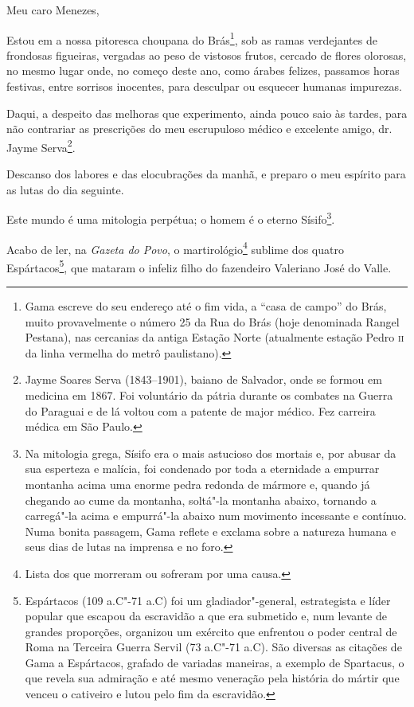 \noindent{}Meu caro Menezes,\smallskip

Estou em a nossa pitoresca choupana do Brás\footnote{Gama escreve do
  seu endereço até o fim vida, a ``casa de campo'' do Brás, muito
  provavelmente o número 25 da Rua do Brás (hoje denominada Rangel
  Pestana), nas cercanias da antiga Estação Norte (atualmente estação
  Pedro \textsc{ii} da linha vermelha do metrô paulistano).}, sob as ramas
verdejantes de frondosas figueiras, vergadas ao peso de vistosos frutos,
cercado de flores olorosas, no mesmo lugar onde, no começo deste ano,
como árabes felizes, passamos horas festivas, entre sorrisos inocentes,
para desculpar ou esquecer humanas impurezas.

Daqui, a despeito das melhoras que experimento, ainda pouco saio às
tardes, para não contrariar as prescrições do meu escrupuloso médico e
excelente amigo, dr.\,Jayme Serva\footnote{Jayme Soares Serva
  (1843--1901), baiano de Salvador, onde se formou em medicina em 1867.
  Foi voluntário da pátria durante os combates na Guerra do Paraguai e
  de lá voltou com a patente de major médico. Fez carreira médica em São
  Paulo.}.

Descanso dos labores e das elocubrações da manhã, e preparo o meu
espírito para as lutas do dia seguinte.

Este mundo é uma mitologia perpétua; o homem é o eterno Sísifo\footnote{
  Na mitologia grega, Sísifo era o mais astucioso dos mortais e, por
  abusar da sua esperteza e malícia, foi condenado por toda a eternidade
  a empurrar montanha acima uma enorme pedra redonda de mármore e,
  quando já chegando ao cume da montanha, soltá"-la montanha abaixo,
  tornando a carregá"-la acima e empurrá"-la abaixo num movimento
  incessante e contínuo. Numa bonita passagem, Gama reflete e exclama
  sobre a natureza humana e seus dias de lutas na imprensa e no foro.}.

Acabo de ler, na \emph{Gazeta do Povo}, o martirológio\footnote{Lista
  dos que morreram ou sofreram por uma causa.} sublime dos quatro
Espártacos\footnote{Espártacos (109 a.C"-71 a.C) foi um \label{espartacos}
  gladiador"-general, estrategista e líder popular que escapou da
  escravidão a que era submetido e, num levante de grandes proporções,
  organizou um exército que enfrentou o poder central de Roma na
  Terceira Guerra Servil (73 a.C"-71 a.C). São diversas as citações de
  Gama a Espártacos, grafado de variadas maneiras, a exemplo de
  Spartacus, o que revela sua admiração e até mesmo veneração pela
  história do mártir que venceu o cativeiro e lutou pelo fim da
  escravidão.}, que mataram o infeliz filho do fazendeiro Valeriano José
do Valle.

